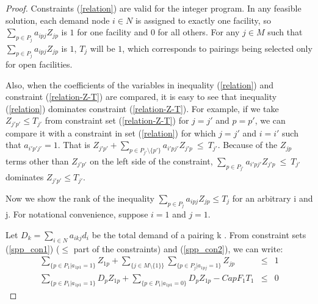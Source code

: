 \begin{proof} 
Constraints (\ref{relation}) are valid for the integer program. In any feasible solution,
each demand node $i \in N$ is assigned to exactly one facility, so $\sum_{p \in P_j} a_{ipj} Z_{jp}$
is $1$ for one facility and $0$ for all others. For any $j \in M$ such that 
$\sum_{p \in P_j} a_{ipj} Z_{jp}$ is $1$, $T_j$ will be $1$, which corresponds 
to pairings being selected only for open facilities. 


Also, when the coefficients of the variables in inequality (\ref{relation}) and constraint 
(\ref{relation-Z-T}) are compared, it is easy to see that inequality (\ref{relation}) 
dominates constraint (\ref{relation-Z-T}). For example, if we take $Z_{j'p'} \leq T_{j'}$
from constraint set (\ref{relation-Z-T}) for $j=j'$ and $p=p'$, we can compare it with a
constraint in set (\ref{relation}) for which $j=j'$ and $i=i'$ such that $a_{i'p'j'}=1$. 
That is $Z_{j'p'}+\sum_{p \in P_{j'}\setminus\{p'\}}a_{i'pj'}Z_{j'p}\ \leq \ T_{j'}$. Because 
of the $Z_{jp}$ terms other than  $Z_{j'p'}$ on the left side of the constraint,   
$\sum_{p \in P_{j'}}a_{i'pj'}Z_{j'p}\ \leq \ T_{j'}$ dominates $Z_{j'p'} \leq T_{j'}$. 

Now we show the rank of the inequality $\sum_{p \in P_j} a_{ipj} Z_{jp} \leq T_j$ 
for an arbitrary i and j. For notational convenience, suppose $i=1$ and $j=1$.  

Let $D_k=\sum_{i \in N}a_{ikj}d_i$ be the total demand of a pairing k . 
From constraint sets (\ref{spp_con1}) ($\leq$ part of the constraints) and (\ref{spp_con2}), 
we can write:
\begin{eqnarray}
 \sum_{\{p \in P_1 | a_{1p1}=1\}} Z_{1p} + \sum_{\{j \in M \setminus \{1\}\}}\sum_{\{p \in P_{j}|a_{1pj}=1\}}Z_{jp}  &\leq & 1 \label{prop2-a} \\
 \sum_{\{p \in P_1 | a_{1p1}=1\}} D_p Z_{1p} + \sum_{\{p \in P_1 | a_{1p1}=0\}} D_p Z_{1p} - CapF_1 T_1 & \leq & 0 \label{prop2-b} 
\end{eqnarray} 


\end{proof}
